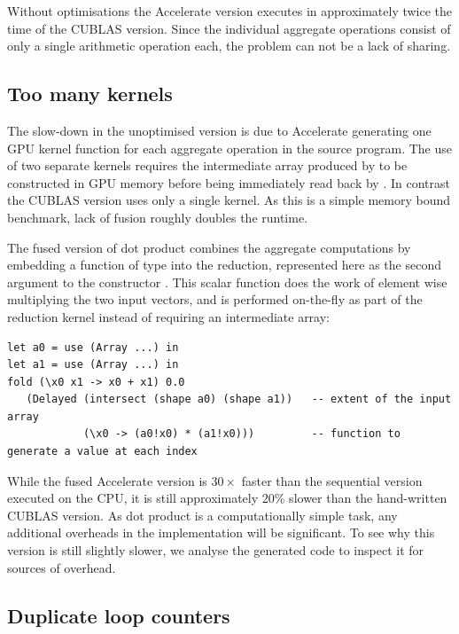 Without optimisations the Accelerate version executes in approximately twice the
time of the CUBLAS version. Since the individual aggregate operations consist of
only a single arithmetic operation each, the problem can not be a lack of
sharing.


\subsection{Too many kernels}

The slow-down in the unoptimised version is due to Accelerate generating one GPU
kernel function for each aggregate operation in the source program. The use of
two separate kernels requires the intermediate array produced by 
to be constructed in GPU memory before being immediately read back by
. In contrast the CUBLAS version uses only a single kernel. As this
is a simple memory bound benchmark, lack of fusion roughly doubles the runtime.

The fused version of dot product combines the aggregate computations by
embedding a function of type  into the reduction, represented
here as the second argument to the constructor . This scalar
function does the work of element wise multiplying the two input vectors, and is
performed on-the-fly as part of the reduction kernel instead of requiring an
intermediate array:
%
\begin{lstlisting}[style=haskell]
let a0 = use (Array ...) in
let a1 = use (Array ...) in
fold (\x0 x1 -> x0 + x1) 0.0
   (Delayed (intersect (shape a0) (shape a1))   -- extent of the input array
            (\x0 -> (a0!x0) * (a1!x0)))         -- function to generate a value at each index
\end{lstlisting}

While the fused Accelerate version is $30\times$ faster than the sequential
version executed on the CPU, it is still approximately $20\%$ slower than the
hand-written CUBLAS version. As dot product is a computationally simple task,
any additional overheads in the implementation will be significant. To see why
this version is still slightly slower, we analyse the generated code to inspect
it for sources of overhead.


\subsection{Duplicate loop counters}

